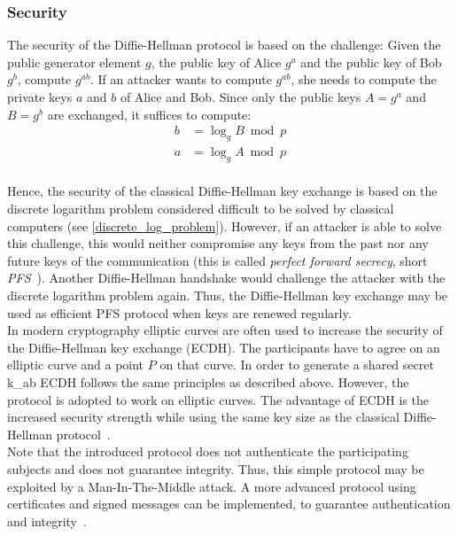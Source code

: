 \subsubsection{Security}
The security of the Diffie-Hellman protocol is based on the challenge: Given the public generator element $g$, the public key of Alice $g^a$ and the public key of Bob $g^b$, compute $g^{ab}$.
If an attacker wants to compute $g^{ab}$, she needs to compute the private keys $a$ and $b$ of Alice and Bob. Since only the public keys $A=g^a$ and $B=g^b$ are exchanged, it suffices to compute:
\begin{equation*}
\begin{split}
b &= \log_g B \bmod p\\ 
a &= \log_g A \bmod p
\end{split}
\end{equation*}
\\
Hence, the security of the classical Diffie-Hellman key exchange is based on the discrete logarithm problem considered difficult to be solved by classical computers (see \autoref{discrete_log_problem}). However, if an attacker is able to solve this challenge, this would neither compromise any keys from the past nor any future keys of the communication (this is called \textit{perfect forward secrecy}, short \textit{\gls{PFS}}~\parencite{ITSicherheit}). Another Diffie-Hellman handshake would challenge the attacker with the discrete logarithm problem again. Thus, the Diffie-Hellman key exchange may be used as efficient \gls{PFS} protocol when keys are renewed regularly.\\
In modern cryptography elliptic curves are often used to increase the security of the Diffie-Hellman key exchange (\gls{ECDH}). The participants have to agree on an elliptic curve and a point $P$ on that curve. In order to generate a shared secret \gls{k_ab} \gls{ECDH} follows the same principles as described above. However, the protocol is adopted to work on elliptic curves. The advantage of \gls{ECDH} is the increased security strength while using the same key size as the classical Diffie-Hellman protocol~\parencite{ITSicherheit}.
\\
Note that the introduced protocol does not authenticate the participating subjects and does not guarantee integrity. Thus, this simple protocol may be exploited by a Man-In-The-Middle attack. A more advanced protocol using certificates and signed messages can be implemented, to guarantee authentication and integrity~\parencite{ITSicherheit}.

